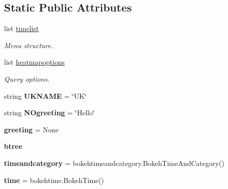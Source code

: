 \subsection*{Static Public Attributes}
\begin{DoxyCompactItemize}
\item 
list \mbox{\hyperlink{classapp_1_1main_1_1boks_1_1Boks_a50e069a721957bccdb1841d00d19d954}{timelist}}
\begin{DoxyCompactList}\small\item\em Menu structure. \end{DoxyCompactList}\item 
list \mbox{\hyperlink{classapp_1_1main_1_1boks_1_1Boks_a9fca61dce81ef716bbe04922482878c8}{heatmapoptions}}
\begin{DoxyCompactList}\small\item\em Query options. \end{DoxyCompactList}\item 
\mbox{\label{classapp_1_1main_1_1boks_1_1Boks_a85a671e45aacb497475936c3834ed235}} 
string {\bfseries U\+K\+N\+A\+ME} = \char`\"{}UK\char`\"{}
\item 
\mbox{\label{classapp_1_1main_1_1boks_1_1Boks_ac8f4e6d848c3cf4f4b8a2f99e08562fc}} 
string {\bfseries N\+Ogreeting} = \char`\"{}Hello\char`\"{}
\item 
\mbox{\label{classapp_1_1main_1_1boks_1_1Boks_ad67863bfb4abf4cd1cee174560f7a335}} 
{\bfseries greeting} = None
\item 
\mbox{\label{classapp_1_1main_1_1boks_1_1Boks_a4d8258f46426c6b9d264e60b7a93fd02}} 
{\bfseries btree}
\item 
\mbox{\label{classapp_1_1main_1_1boks_1_1Boks_aea3f7421879503580c22b8e3e6c40bfe}} 
{\bfseries timeandcategory} = bokehtimeandcategory.\+Bokeh\+Time\+And\+Category()
\item 
\mbox{\label{classapp_1_1main_1_1boks_1_1Boks_ada877ef3ee5a0d6f26f30699a594244c}} 
{\bfseries time} = bokehtime.\+Bokeh\+Time()
\item 
\mbox{\label{classapp_1_1main_1_1boks_1_1Boks_adb071826a4e1d3632061509c98ecfd4e}} 

\end{DoxyCompactItemize}
